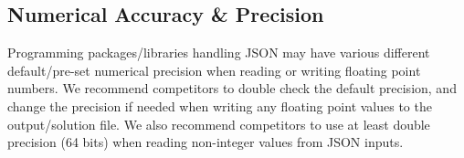\subsection{Numerical Accuracy \& Precision}
Programming packages/libraries handling JSON may have various different 
default/pre-set numerical precision when reading or writing floating point numbers.
We recommend competitors to 
double check the default precision,
and change the precision if needed
when writing any floating point values to the output/solution file.
We also recommend competitors to use at least double precision (64 bits) 
when reading non-integer values from JSON inputs. 




